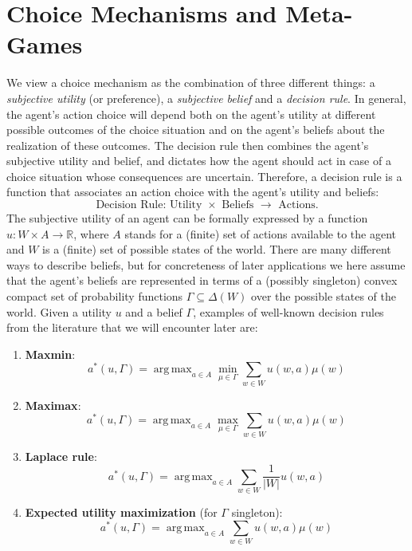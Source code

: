 \documentclass[fleqn,reqno,12pt]{article}
\theoremstyle{Satz}
\theoremstyle{Bsp}
\DeclareMathOperator*{\argmax}{arg\,max}
\begin{document}
\section{Choice Mechanisms and Meta-Games} 
\label{sec:subj-ut,bel,dec-rules}


We view a choice mechanism as the combination of three different things: a \textit{subjective utility} (or preference), a \textit{subjective belief} and a \textit{decision rule}. In general, the agent's action choice will depend both on the agent's utility at different possible outcomes of the choice situation and on the agent's beliefs about the realization of these outcomes. The decision rule then combines the agent's subjective utility and belief, and dictates how the agent should act in case of a choice situation whose consequences are uncertain. Therefore, a decision rule is a function that associates an action choice with the agent's utility and beliefs:
$$ \text{Decision Rule: Utility }\times\text{ Beliefs } \rightarrow \text{ Actions.}  $$
The subjective utility of an agent can be formally expressed by a function
$u:W \times A \rightarrow \mathbb{R} $, where $A$ stands for a (finite) set of actions
available to the agent and $W$ is a (finite) set of possible states of the world. There are
many different ways to describe beliefs, but for concreteness of later applications we here
assume that the agent's beliefs are represented in terms of a (possibly singleton) convex compact set of
probability functions $\Gamma \subseteq \Delta(W) $ over the possible states of the
world. Given a utility $u$ and a belief $\Gamma$, examples of well-known decision rules from the literature that we will encounter later are:
\begin{enumerate}

\item \textbf{Maxmin}: $$ a^*(u,\Gamma)= \argmax_{a \in A} \min_{\mu \in \Gamma} \sum_{w\in W} u(w,a)  \mu(w)$$

\item \textbf{Maximax}: $$ a^*(u,\Gamma)= \argmax_{a \in A} \max_{\mu \in \Gamma} \sum_{w\in W} u(w,a)  \mu(w)$$

\item \textbf{Laplace rule}: $$ a^*(u,\Gamma)= \argmax_{a \in A} \sum_{w\in W} \frac{1}{|W|}  u(w,a) $$

\item \textbf{Expected utility maximization} (for $\Gamma$ singleton): $$ a^*(u,\Gamma)= \argmax_{a \in A} \sum_{w\in W} u(w,a)  \mu(w)$$

\end{enumerate}
\end{document}
